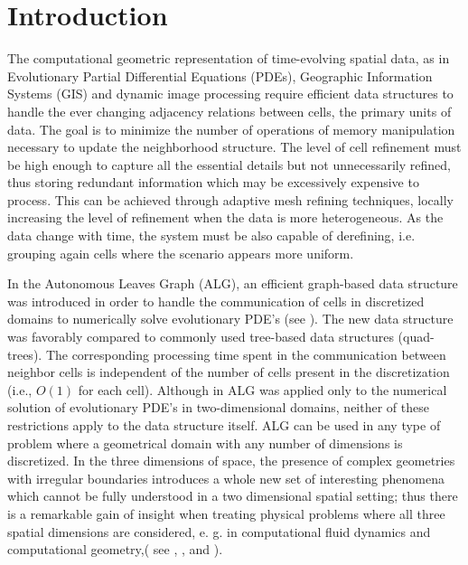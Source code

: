 	\section{Introduction}

The computational geometric representation of time-evolving spatial data, as in Evolutionary Partial Differential Equations (PDEs), Geographic Information Systems (GIS) and dynamic image processing require efficient data structures to handle the ever changing adjacency relations between cells, the primary units of data. The goal is to minimize the number of operations of memory manipulation necessary to update the neighborhood structure. The level of cell refinement must be high enough to capture all the essential details but not unnecessarily refined, thus storing redundant information which may be excessively expensive to process. This can be achieved through adaptive mesh refining techniques, locally increasing the level of refinement when the data is more heterogeneous. As the data change with time, the system must be also capable of derefining, i.e. grouping again cells where the scenario appears more uniform.

In \cite{Burgarelli1998} the Autonomous Leaves Graph (ALG), an efficient graph-based data structure was introduced
in order to handle the communication of cells in discretized domains to numerically solve evolutionary
PDE's (see \cite{Burgarellietal2006}). The new data structure was favorably compared to commonly used tree-based
data structures (quad-trees). The corresponding processing time spent in the communication between
neighbor cells is independent of the number of cells present in the discretization (i.e.,
$O(1)$ for each cell).
Although in \cite{Burgarellietal2006} ALG was applied only to the numerical
solution of evolutionary PDE's
in two-dimensional domains, neither of these restrictions apply to the data structure itself.
ALG can be used in any type of problem where a geometrical domain with any number
of dimensions is discretized.
In the three dimensions of space, the presence of complex geometries with irregular boundaries introduces a whole new set of interesting phenomena which cannot be fully understood in a two dimensional spatial setting; thus there is a remarkable gain of insight when treating physical problems where all three spatial dimensions are considered, e. g. in computational fluid dynamics and computational geometry,( see
 \cite{Gamezoetal2005a}, \cite{Jietal2008}, \cite{Penneretal2007} and
\cite{tavakoli2006}).

